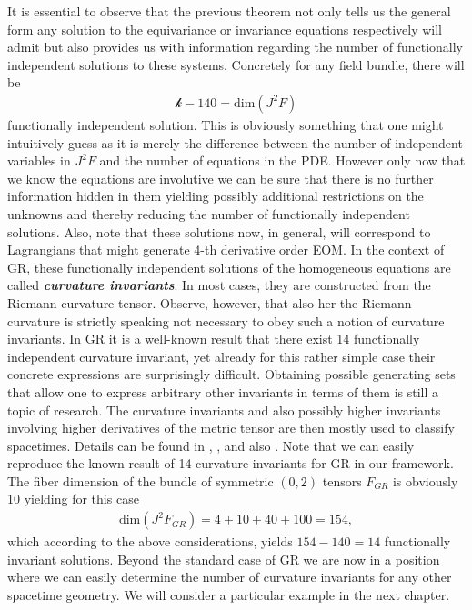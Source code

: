 \documentclass[a4paper,12pt, DIV=14, BCOR=5mm, twoside, headsepline, numbers=noenddot]{scrbook}
\begin{document}
It is essential to observe that the previous theorem not only tells us the general form any solution to the equivariance or invariance equations respectively will admit but also provides us with information regarding the number of functionally independent solutions to these systems. Concretely for any field bundle, there will be 
\begin{align}
    \mathcal{k} - 140 = \mathrm{dim}(J^2F)
\end{align}
functionally independent solution. This is obviously something that one might intuitively guess as it is merely the difference between the number of independent variables in $J^2F$ and the number of equations in the PDE. However only now that we know the equations are involutive we can be sure that there is no further information hidden in them yielding possibly additional restrictions on the unknowns and thereby reducing the number of functionally independent solutions. 
Also, note that these solutions now, in general, will correspond to Lagrangians that might generate 4-th derivative order EOM. 
In the context of GR, these functionally independent solutions of the homogeneous equations are called \textit{\textbf{curvature invariants}}. In most cases, they are constructed from the Riemann curvature tensor. Observe, however, that also her the Riemann curvature is strictly speaking not necessary to obey such a notion of curvature invariants. 
In GR it is a well-known result that there exist 14 functionally independent curvature invariant, yet already for this rather simple case their concrete expressions are surprisingly difficult. Obtaining possible generating sets that allow one to express arbitrary other invariants in terms of them is still a topic of research. The curvature invariants and also possibly higher invariants involving higher derivatives of the metric tensor are then mostly used to classify spacetimes. Details can be found in
\cite{2009CQGra..26b5013C}, \cite{Zakhary1997}, \cite{2002IJMPD..11..827C} and also \cite{doi:10.1063/1.531425}.
Note that we can easily reproduce the known result of 14 curvature invariants for GR in our framework. The fiber dimension of the bundle of symmetric $(0,2)$ tensors $F_{GR}$ is obviously 10 yielding for this case 
\begin{align}
    \mathrm{dim}(J^2F_{GR}) = 4 + 10 + 40 + 100 = 154,
\end{align}
which according to the above considerations, yields $154-140=14$ functionally invariant solutions. Beyond the standard case of GR we are now in a position where we can easily determine the number of curvature invariants for any other spacetime geometry. We will consider a particular example in the next chapter.
\end{document}
